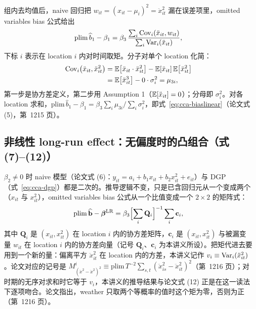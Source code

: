 \begin{intuition}
组内去均值后，naive 回归把 $w_{it}=(x_{it}-\mu_i)^2=\ddot{x}_{it}^2$ 漏在误差项里，omitted variables bias 公式给出
\begin{equation}
\mathrm{plim}\,\widehat{b}_1-\beta_1=\beta_3\,\frac{\sum_i\operatorname{Cov}_i(\ddot{x}_{it},w_{it})}{\sum_i\operatorname{Var}_i(\ddot{x}_{it})},
\label{eq:cca-ovb}
\end{equation}
下标 $i$ 表示在 location $i$ 内对时间取矩。分子对单个 location 化简：
\begin{align}
\operatorname{Cov}_i\bigl(\ddot{x}_{it},\ddot{x}_{it}^{2}\bigr)
&=\mathbb{E}\bigl[\ddot{x}_{it}\cdot\ddot{x}_{it}^{2}\bigr]-\mathbb{E}[\ddot{x}_{it}]\,\mathbb{E}\bigl[\ddot{x}_{it}^{2}\bigr] \notag\\
&=\mathbb{E}\bigl[\ddot{x}_{it}^{3}\bigr]-0\cdot\sigma_i^2
=\mu_{3i},
\label{eq:cca-moment}
\end{align}
第一步是协方差定义，第二步用 Assumption 1（$\mathbb{E}[\ddot{x}_{it}]=0$）；分母即 $\sigma_i^2$。对各 location 求和，$\mathrm{plim}\,\widehat{b}_1-\beta_1=\beta_3\sum_i\mu_{3i}\big/\sum_i\sigma_i^2$，即式~\ref{eq:cca-biaslinear}（论文式 (5)，第~1215 页）。
\end{intuition}

\subsection{非线性 long-run effect：无偏度时的凸组合（式 (7)--(12)）}

$\beta_2\neq 0$ 时 naive 模型（论文式 (6)：$y_{it}=a_i+b_1x_{it}+b_2x_{it}^2+e_{it}$）与 DGP（式~\ref{eq:cca-dgp}）都是二次的。推导逻辑不变，只是已含回归元从一个变成两个（$x_{it}$ 与 $x_{it}^2$），omitted variables bias 公式从一个比值变成一个 $2\times2$ 的矩阵式：
\begin{equation}
\mathrm{plim}\,\widehat{\mathbf{b}}-\boldsymbol{\beta}^{\mathrm{LR}}
=\beta_3\Bigl[\sum_i \mathbf{Q}_i\Bigr]^{-1}\sum_i \mathbf{c}_i ,
\label{eq:cca-ovb2}
\end{equation}
其中 $\mathbf{Q}_i$ 是 $(x_{it},x_{it}^2)$ 在 location $i$ 内的协方差矩阵，$\mathbf{c}_i$ 是 $(x_{it},x_{it}^2)$ 与被漏变量 $w_{it}$ 在 location $i$ 内的协方差向量（记号 $\mathbf{Q}_i$、$\mathbf{c}_i$ 为本讲义所设）。把矩代进去要用到一个新的量：偏离平方 $\ddot{x}_{it}^2$ 在 location 内的方差，本讲义记作 $v_i\equiv\operatorname{Var}_i(\ddot{x}_{it}^2)$。论文对应的记号是 $M^i_{(\ddot{x}^2-\ddot{x}^2)^2}\equiv\mathrm{plim}\,T^{-2}\sum_{s,t}(\ddot{x}_{is}^2-\ddot{x}_{it}^2)^2$（第~1216 页）；对时期的无序对求和时它等于 $v_i$，本讲义的推导结果与论文式 (12) 正是在这一读法下逐项吻合。论文指出，weather 只取两个等概率的值时这个矩为零，否则为正（第~1216 页）。

